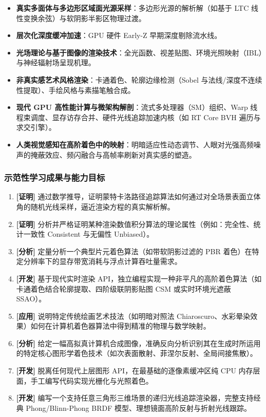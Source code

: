 \begin{itemize}
    \item \textbf{真实多面体与多边形区域面光源采样}：多边形光源的解析解（如基于 LTC 线性变换余弦）与软阴影半影区物理过渡。
    \item \textbf{层次化深度缓冲加速}：GPU 硬件 Early-Z 早期深度剔除流水线。
    \item \textbf{光场理论与基于图像的渲染技术}：全光函数、视差贴图、环境光照映射（IBL）与神经辐射场呈现机理。
    \item \textbf{非真实感艺术风格渲染}：卡通着色、轮廓边缘检测（Sobel 与法线/深度不连续性提取）、手绘风格与素描笔触合成。
    \item \textbf{现代 GPU 高性能计算与微架构解剖}：流式多处理器（SM）组织、Warp 线程束调度、显存访存合并、硬件光线追踪加速内核（如 RT Core BVH 遍历与求交引擎）。
    \item \textbf{人类视觉感知在高阶着色中的映射}：明暗适应性动态调节、人眼对光强高频噪声的掩蔽效应、频闪融合与高帧率刷新对真实感的塑造。
\end{itemize}

\subsubsection{示范性学习成果与能力目标}
\begin{enumerate}
    \item \textbf{[证明]} 通过数学推导，证明蒙特卡洛路径追踪算法如何通过对全场景表面立体角的随机光线采样，逼近渲染方程的真实解析解。
    \item \textbf{[证明]} 分析并严格证明某种渲染数值积分算法的理论属性（例如：完全性、统计一致性 Consistent 与无偏性 Unbiased）。
    \item \textbf{[分析]} 定量分析一个典型片元着色算法（如带软阴影过滤的 PBR 着色）在特定分辨率下的显存带宽消耗与浮点计算吞吐量需求。
    \item \textbf{[开发]} 基于现代实时渲染 API，独立编程实现一种非平凡的高阶着色算法（如卡通着色结合轮廓提取、四阶级联阴影贴图 CSM 或实时环境光遮蔽 SSAO）。
    \item \textbf{[应用]} 说明特定传统绘画艺术技法（如明暗对照法 Chiaroscuro、水彩晕染效果）如何在计算机着色器算法中得到精准的物理与数学映射。
    \item \textbf{[分析]} 给定一幅高拟真计算机合成图像，准确反向分析识别其在生成时所运用的特定核心图形学着色技术（如次表面散射、菲涅尔反射、全局间接焦散）。
    \item \textbf{[开发]} 脱离任何现代上层图形 API，在最基础的逐像素缓冲区纯 CPU 内存层面，手工编写代码实现光栅化与光照着色。
    \item \textbf{[开发]} 编写一个支持任意三角形三维场景的递归光线追踪渲染器，完整支持经典 Phong/Blinn-Phong BRDF 模型、理想镜面高阶反射与折射光线跟踪。
\end{enumerate}

